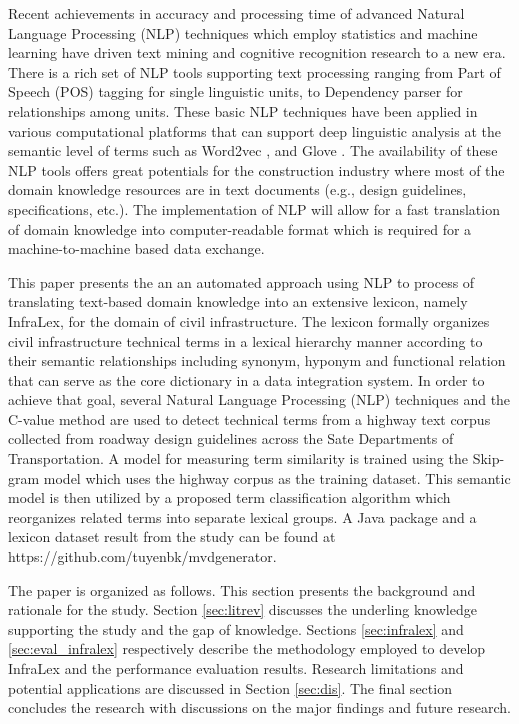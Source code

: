 \documentclass[Journal,InsideFigs, DoubleSpace]{ascelike} %
\begin{document}
Recent achievements in accuracy and processing time of advanced Natural Language Processing (NLP) techniques which employ statistics and machine learning have driven text mining and cognitive recognition research to a new era. There is a rich set of NLP tools supporting text processing ranging from  Part of Speech (POS) tagging \cite{Toutanova03,Cunningham02} for single linguistic units, to Dependency parser \cite{chen14} for relationships among units. These basic NLP techniques have been applied in various computational platforms that can support deep linguistic analysis at the semantic level of terms such as Word2vec \cite{mikolov13a}, and Glove \cite{pennington2014glove}. The availability of these NLP tools offers great potentials for the construction industry where most of the domain knowledge resources are in text documents (e.g., design guidelines, specifications, etc.). The implementation of NLP will allow for a fast translation of domain knowledge into computer-readable format which is required for a machine-to-machine based data exchange.
\par
This paper presents the an an automated approach using NLP to process of translating text-based domain knowledge into an extensive lexicon, namely InfraLex, for the domain of civil infrastructure. The lexicon formally organizes civil infrastructure technical terms in a lexical hierarchy manner according to their semantic relationships including synonym, hyponym and functional relation that can serve as the core dictionary in a data integration system. In order to achieve that goal, several Natural Language Processing (NLP) techniques and the C-value method \cite{frantzi20} are used to detect technical terms from a highway text corpus collected from roadway design guidelines across the Sate Departments of Transportation. A model for measuring term similarity is trained using the Skip-gram model \cite{mikolov13a} which uses the highway corpus as the training dataset. This semantic model is then utilized by a proposed term classification algorithm which reorganizes related terms into separate lexical groups. A Java package and a lexicon dataset result from the study can be found at https://github.com/tuyenbk/mvdgenerator.
%
\par
The paper is organized as follows. This section presents the background and rationale for the study. Section \ref{sec:litrev} discusses the underling knowledge supporting the study and the gap of knowledge. Sections \ref{sec:infralex} and \ref{sec:eval_infralex} respectively describe the methodology employed to develop InfraLex and the performance evaluation results. Research limitations and potential applications are discussed in Section \ref{sec:dis}. The final section concludes the research with discussions on the major findings and future research.
% 
\end{document}

